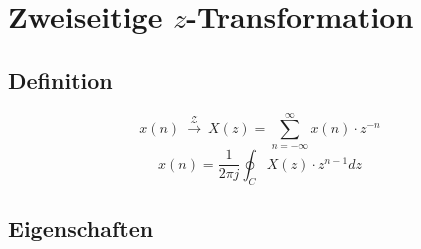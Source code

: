 \documentclass[10pt,a4paper]{article}
\newcommand{\ztransform}{
	~\xrightarrow{~\mathcal{Z}~}~
}
\begin{document}
\section*{Zweiseitige $z$-Transformation}
\subsection*{Definition}
\vspace{-1.5em}
\begin{multicols}{2}
	\noindent
	\[ x(n)\ztransform X(z)=\sum_{n=-\infty}^{\infty}x(n)\cdot z^{-n} \]
	\[x(n)=\frac{1}{2\pi j}\oint_{C}X(z)\cdot z^{n-1}dz \]
\end{multicols}

\subsection*{Eigenschaften}
\vspace{-1.5em}
\end{document}
